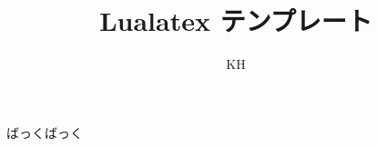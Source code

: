 \documentclass[a4paper,12pt]{jlreq}
\title{Lualatex テンプレート}
\author{KH}
\date{}
\numberwithin{equation}{subsection}
\begin{document}
\maketitle
ばっくばっく
\end{document}
